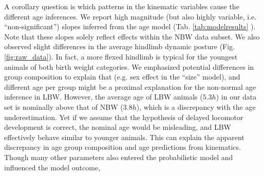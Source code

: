 A corollary question is which patterns in the kinematic variables cause the different age inferences.
We report high magnitude (but also highly variable, i.e. ``non-significant'') slopes inferred from the age model (Tab. \ref{tab:modelresults} ).
Note that these slopes solely reflect effects within the NBW data subset.
We also observed slight differences in the average hindlimb dynamic posture (Fig. \ref{fig:raw_data}).
In fact, a more flexed hindlimb is typical for the youngest animals of both birth weight categories.
We emphasized potential differences in group composition to explain that (e.g. sex effect in the ``size'' model), and different age per group might be a proximal explanation for the non-normal age inference in LBW.
However, the average age of LBW animals (\(5.3 h\)) in our data set is nominally above that of NBW (\(3.8 h\)), which is a discrepancy with the age underestimation.
Yet if we assume that the hypothesis of delayed locomotor development is correct, the nominal age would be misleading, and LBW effectively behave similar to younger animals.
This can explain the apparent discrepancy in age group composition and age predictions from kinematics.
Though many other parameters also entered the probabilistic model and influenced the model outcome, 


\bigskip

